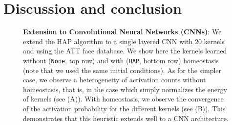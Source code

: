 \documentclass[vision,article,submit,oneauthor,pdftex]{Definitions/mdpi}
\newcommand{\seeFig}[1]{Figure~\ref{fig:#1}}%
\begin{document}
\section{Discussion and conclusion}\label{discussion-et-conclusion}
\begin{figure}%
\caption{
{\bf Extension to Convolutional Neural Networks (CNNs)}: %
 We extend the HAP algorithm to a single layered CNN with $20$ kernels and using the ATT face database. We show here the kernels learned without (\texttt{None}, top row) and with (\texttt{HAP}, bottom row) homeostasis (note that we used the same initial conditions). As for the simpler case, we observe a heterogeneity of activation counts without homeostasis, that is, in the case which simply normalizes the energy of kernels (see {\sf (A)}). With homeostasis, we observe the convergence of the activation probability for the different kernels (see {\sf (B)}). This demonstrates that this heuristic extends well to a CNN architecture.
\label{fig:CNN}}%
\end{figure}%
\end{document}
